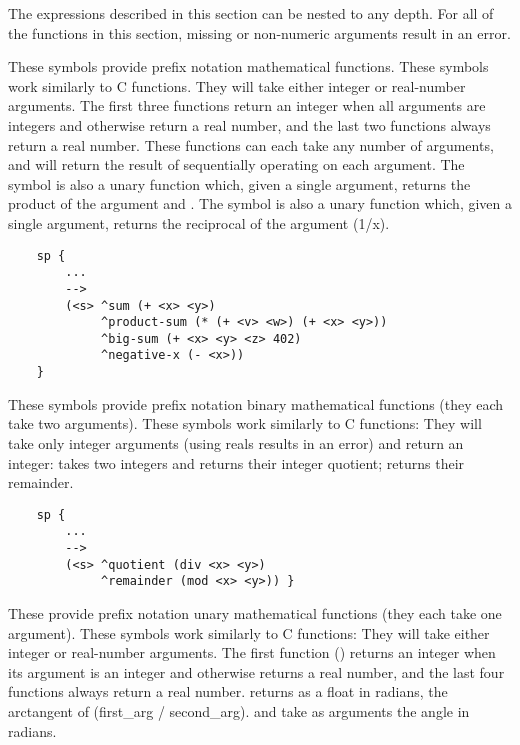 The expressions described in this section can be nested to any depth. For all of the functions in this section, missing or non-numeric arguments result in an error.


\begin{description}

\item [\soarb{+, -, *, /} --- ]
	These symbols provide prefix notation mathematical functions. These symbols work similarly to C functions.  They will take either integer or real-number arguments. The first three functions return an integer when all arguments are integers and otherwise return a real number, and the last two functions always return a real number. These functions can each take any number of arguments, and will return the result of sequentially operating on each argument. The \soar{-} symbol is also a unary function which, given a single argument, returns the product of the argument and .  The \soar{/} symbol is also a unary function which, given a single argument, returns the reciprocal of the argument (1/x).

	\begin{verbatim}
	sp {
	    ...
	    -->
	    (<s> ^sum (+ <x> <y>)
	         ^product-sum (* (+ <v> <w>) (+ <x> <y>))
	         ^big-sum (+ <x> <y> <z> 402)
	         ^negative-x (- <x>))
	}
	\end{verbatim}

\item [\soarb{div, mod} --- ]
	These symbols provide prefix notation binary mathematical functions (they each take two arguments). These symbols work similarly to C functions: They will take only integer arguments (using reals results in an error) and return an integer:  takes two integers and returns their integer quotient;  returns their remainder.

	\begin{verbatim}
	sp {
	    ...
	    -->
	    (<s> ^quotient (div <x> <y>)
	         ^remainder (mod <x> <y>)) }
	\end{verbatim}

\item [\soarb{abs, atan2, sqrt, sin, cos} --- ]
	These provide prefix notation unary mathematical functions (they each take one argument). These symbols work similarly to C functions: They will take either integer or real-number arguments. The first function () returns an integer when its argument is an integer and otherwise returns a real number, and the last four functions always return a real number.   returns as a float in radians, the arctangent of (first\_arg / second\_arg).  and  take as arguments the angle in radians.


\end{description}
